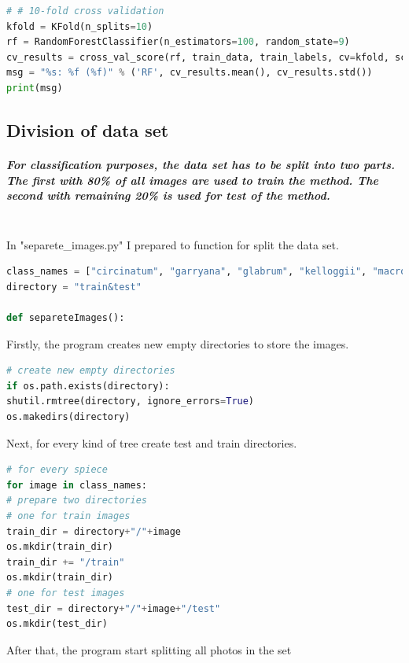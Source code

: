 \documentclass[12pt]{article}
\begin{document}
\begin{lstlisting}[language=Python]
# # 10-fold cross validation
kfold = KFold(n_splits=10)
rf = RandomForestClassifier(n_estimators=100, random_state=9)
cv_results = cross_val_score(rf, train_data, train_labels, cv=kfold, scoring="accuracy")
msg = "%s: %f (%f)" % ('RF', cv_results.mean(), cv_results.std())
print(msg)
\end{lstlisting}

\newpage

\subsection{Division of data set}

\subparagraph{
For classification purposes, the data set has to be split into two parts. The first with 80\% of all images are used to train the method. The second with remaining 20\% is used for test of the method. \\\\
}

In "separete\_images.py" I prepared to function for split the data set.

\begin{lstlisting}[language=Python]
class_names = ["circinatum", "garryana", "glabrum", "kelloggii", "macrophyllum","negundo"]
directory = "train&test"

def separeteImages():
\end{lstlisting}

Firstly, the program creates new empty directories to store the images.

\begin{lstlisting}[language=Python]
# create new empty directories
if os.path.exists(directory):
shutil.rmtree(directory, ignore_errors=True)
os.makedirs(directory)
\end{lstlisting}

Next, for every kind of tree create test and train directories.

\begin{lstlisting}[language=Python]
# for every spiece
for image in class_names:
# prepare two directories
# one for train images
train_dir = directory+"/"+image
os.mkdir(train_dir)
train_dir += "/train"
os.mkdir(train_dir)
# one for test images
test_dir = directory+"/"+image+"/test"
os.mkdir(test_dir)
\end{lstlisting}

After that, the program start splitting all photos in the set
\end{document}
